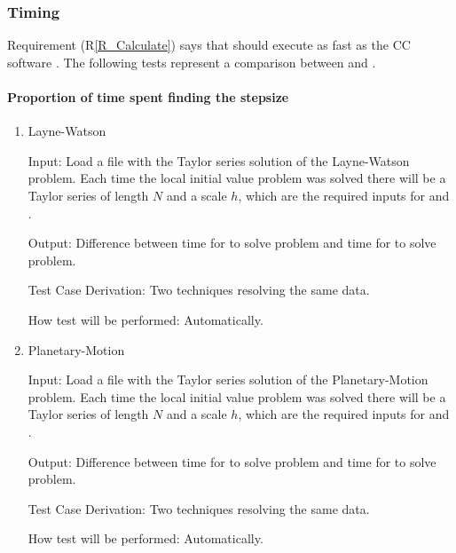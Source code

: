 \documentclass[12pt, titlepage]{article}
\newcommand{\rref}[1]{(R\ref{#1})}
\begin{document}
\subsubsection{Timing}

Requirement \rref{R_Calculate} says that  should execute as fast as
the CC software \rdcon. The following tests represent a comparison between
 and \rdcon.

\paragraph{Proportion of time spent finding the stepsize}

\begin{enumerate}

  \item{Layne-Watson \citep{watson1979}\\}

					
					
Input: Load a file with the Taylor series solution of the Layne-Watson problem. Each time the
    local initial value problem was solved there will be a Taylor series of length $N$ and a scale $h$,
    which are the required inputs for  and \rdcon.
					
Output: Difference between time for  to solve problem and time for \rdcon to solve problem.

Test Case Derivation: Two techniques resolving the same data.
					
How test will be performed: Automatically.
					
\item{Planetary-Motion \citep{enright1987examples}\\}

					
					
Input: Load a file with the Taylor series solution of the Planetary-Motion problem. Each time the
    local initial value problem was solved there will be a Taylor series of length $N$ and a scale $h$,
    which are the required inputs for  and \rdcon.
					
Output: Difference between time for  to solve problem and time for \rdcon to solve problem.

Test Case Derivation: Two techniques resolving the same data.
					
How test will be performed: Automatically.

\end{enumerate}
\end{document}
